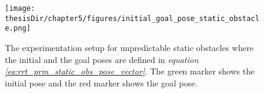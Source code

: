 \begin{figure}
  \centering
  \captionsetup{justification=centering}
  \texttt{[image: \\thesisDir/chapter5/figures/initial\_goal\_pose\_static\_obstacle.png]}
  \caption{The experimentation setup for unpredictable static obstacles where the initial and the goal poses are defined in \textit{equation \ref{eq:rrt_prm_static_obs_pose_vector}}. The green marker shows the initial pose and the red marker shows the goal pose.}
  \label{fig:initial_goal_pose_static_obstacle}
\end{figure}

